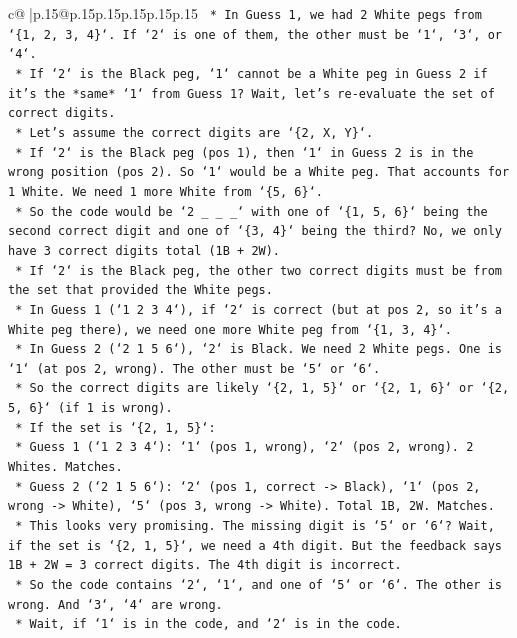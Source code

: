 \documentclass{article}
\begin{document}
{\begin{supertabular}{c@{$\;$}|p{.15\linewidth}@{}p{.15\linewidth}p{.15\linewidth}p{.15\linewidth}p{.15\linewidth}p{.15\linewidth}}
{{{\texttt{    *   In Guess 1, we had 2 White pegs from `\{1, 2, 3, 4\}`. If `2` is one of them, the other must be `1`, `3`, or `4`.} \\
\texttt{    *   If `2` is the Black peg, `1` cannot be a White peg in Guess 2 if it's the *same* `1` from Guess 1? Wait, let's re{-}evaluate the set of correct digits.} \\
\texttt{    *   Let's assume the correct digits are `\{2, X, Y\}`.} \\
\texttt{    *   If `2` is the Black peg (pos 1), then `1` in Guess 2 is in the wrong position (pos 2). So `1` would be a White peg. That accounts for 1 White. We need 1 more White from `\{5, 6\}`.} \\
\texttt{    *   So the code would be `2 \_ \_ \_` with one of `\{1, 5, 6\}` being the second correct digit and one of `\{3, 4\}` being the third? No, we only have 3 correct digits total (1B + 2W).} \\
\texttt{    *   If `2` is the Black peg, the other two correct digits must be from the set that provided the White pegs.} \\
\texttt{    *   In Guess 1 (`1 2 3 4`), if `2` is correct (but at pos 2, so it's a White peg there), we need one more White peg from `\{1, 3, 4\}`.} \\
\texttt{    *   In Guess 2 (`2 1 5 6`), `2` is Black. We need 2 White pegs. One is `1` (at pos 2, wrong). The other must be `5` or `6`.} \\
\texttt{    *   So the correct digits are likely `\{2, 1, 5\}` or `\{2, 1, 6\}` or `\{2, 5, 6\}` (if 1 is wrong).} \\
\texttt{    *   If the set is `\{2, 1, 5\}`:} \\
\texttt{        *   Guess 1 (`1 2 3 4`): `1` (pos 1, wrong), `2` (pos 2, wrong). 2 Whites. Matches.} \\
\texttt{        *   Guess 2 (`2 1 5 6`): `2` (pos 1, correct {-}> Black), `1` (pos 2, wrong {-}> White), `5` (pos 3, wrong {-}> White). Total 1B, 2W. Matches.} \\
\texttt{        *   This looks very promising. The missing digit is `5` or `6`? Wait, if the set is `\{2, 1, 5\}`, we need a 4th digit. But the feedback says 1B + 2W = 3 correct digits. The 4th digit is incorrect.} \\
\texttt{        *   So the code contains `2`, `1`, and one of `5` or `6`. The other is wrong. And `3`, `4` are wrong.} \\
\texttt{        *   Wait, if `1` is in the code, and `2` is in the code.} \\
}}}
\end{supertabular}}
\end{document}
